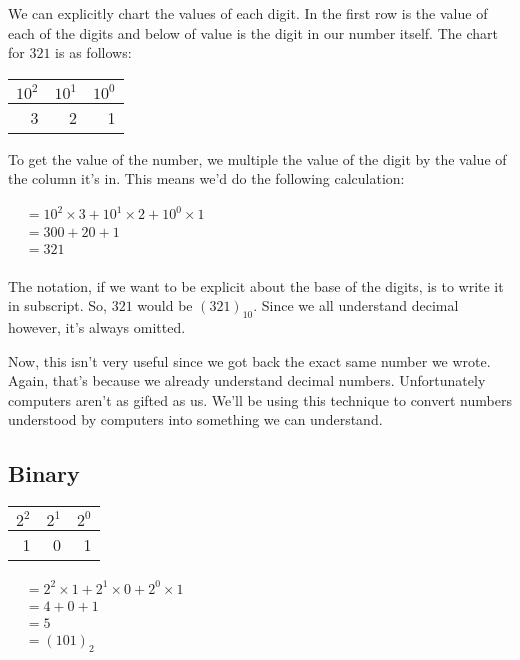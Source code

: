We can explicitly chart the values of each digit. In the first row is the value
of each of the digits and below of value is the digit in our number itself. The
chart for $321$ is as follows:

\begin{center}
  \begin{tabular}{r | r | r}
    $10^2$ & $10^1$ & $10^0$ \\
    \hline
         3 &      2 &      1 \\
  \end{tabular}
\end{center}

To get the value of the number, we multiple the value of the digit by the value
of the column it's in. This means we'd do the following calculation:

\begin{center}
  \begin{math}
    \begin{aligned}
&= 10^2 \times 3 + 10^1 \times 2 + 10^0 \times 1 \\
&= 300 + 20 + 1 \\
&= 321 \\
    \end{aligned}
  \end{math}
\end{center}

The notation, if we want to be explicit about the base of the digits, is to
write it in subscript. So, $321$ would be $(321)_{10}$. Since we all understand
decimal however, it's always omitted.

Now, this isn't very useful since we got back the exact same number we wrote.
Again, that's because we already understand decimal numbers. Unfortunately
computers aren't as gifted as us. We'll be using this technique to convert
numbers understood by computers into something we can understand.

\label{sec:numeral-system-binary}
\subsection{Binary}

\begin{center}
  \begin{tabular}{r | r | r}
    $2^2$ & $2^1$ & $2^0$ \\
    \hline
        1 &      0 &      1 \\
  \end{tabular}

  \vspace{1em}

  \begin{math}
    \begin{aligned}
&= 2^2 \times 1 + 2^1 \times 0 + 2^0 \times 1 \\
&= 4 + 0 + 1 \\
&= 5 \\
&= (101)_2 \\
    \end{aligned}
  \end{math}
\end{center}

